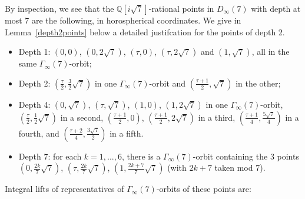 \documentclass{article}[12pt]
\newcommand{\Q}{\mathbb{Q}}
\begin{document}
By inspection, we see that the $\Q[i\sqrt{7}]$-rational points in $D_\infty(7)$ with depth at most 7 are the following, in horospherical coordinates. We give in Lemma~\ref{depth2points} below a detailed justifcation for the points of depth 2.

\begin{itemize}
\item Depth 1: $(0,0)$, $(0,2\sqrt{7})$, $(\tau,0)$, $(\tau,2\sqrt{7})$ and $(1,\sqrt{7})$, all in the same $\Gamma_\infty(7)$-orbit;
\item Depth 2: $(\frac{\tau}{2},\frac{3}{2}\sqrt{7})$ in one $\Gamma_\infty(7)$-orbit and $(\frac{\tau+1}{2},\sqrt{7})$ in the other;
\item Depth 4:   $(0,\sqrt{7})$, $(\tau,\sqrt{7})$, $(1,0)$, $(1,2\sqrt{7})$ in one $\Gamma_\infty(7)$-orbit, $(\frac{\tau}{2},\frac{1}{2}\sqrt{7})$ in a second, $(\frac{\tau+1}{2},0)$, $(\frac{\tau+1}{2},2\sqrt{7})$ in a third, $(\frac{\tau+1}{4}, \frac{5\sqrt{7}}{4})$ in a fourth, and $(\frac{\tau+2}{4},\frac{3\sqrt{7}}{2})$ in a fifth.
  \item Depth 7: for each $k=1,...,6$, there is a $\Gamma_\infty(7)$-orbit containing the 3 points $(0,\frac{2k}{7}\sqrt{7})$, $(\tau,\frac{2k}{7}\sqrt{7})$, $(1,\frac{2k+7}{7}\sqrt{7})$ (with $2k+7$ taken mod 7).  
  \end{itemize}

Integral lifts of representatives of $\Gamma_\infty(7)$-orbits of these points are:
\end{document}

